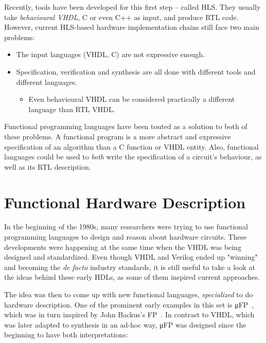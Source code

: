         Recently, tools have been developed for this first step – called \ac{HLS}.
        They usually take \emph{behavioural \acs{VHDL}}, C or even C++ as input, and produce \ac{RTL} code.
        However, current \acs{HLS}-based hardware implementation chains still face two main problems:

        \begin{itemize}
            \item The input languages (VHDL, C) are not expressive enough.
            \item Specification, verification and synthesis are all done with different tools and different languages.
            \begin{itemize}
                \item Even behavioural \acs{VHDL} can be considered practically a different language
                    than \acl{RTL} \acs{VHDL}.
            \end{itemize}
        \end{itemize}

        Functional programming languages have been touted as a solution to both of these problems.
        A functional program is a more abstract and expressive specification of an algorithm than
        a C function or VHDL entity.
        Also, functional languages could be used to \emph{both} write the specification of a circuit's behaviour,
        as well as its \acl{RTL} description.


    \section{Functional Hardware Description}
    \label{sec:functional-hardware}
        In the beginning of the 1980s, many researchers were trying to use functional programming languages
        to design and reason about hardware circuits.
        These developments were happening at the same time when the \ac{VHDL} was being designed and standardized.
        Even though \ac{VHDL} and Verilog ended up "winning" and becoming the \emph{de facto} industry standards,
        it is still useful to take a look at the ideas behind these early \acp{HDL}, as some of them
        inspired current approaches.

        The idea was then to come up with new functional languages, \emph{specialized} to do hardware description.
        One of the prominent early examples in this set is μFP~\cite{mufp-1984},
        which was in turn inspired by John Backus's FP~\cite{backus-turing-lecture}.
        In contrast to \ac{VHDL}, which was later adapted to synthesis in an ad-hoc way,
        μFP was designed since the beginning to have both interpretations:

